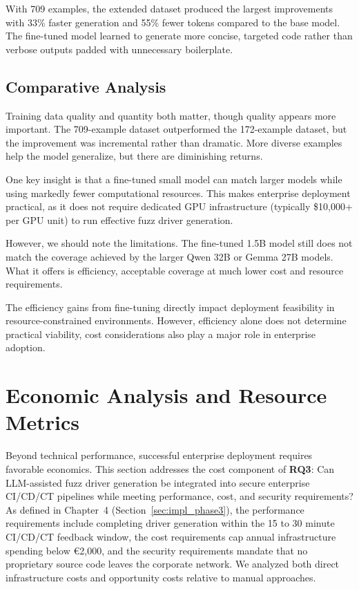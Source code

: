With 709 examples, the extended dataset produced the largest improvements with 33\% faster generation and 55\% fewer tokens compared to the base model. The fine-tuned model learned to generate more concise, targeted code rather than verbose outputs padded with unnecessary boilerplate.


\subsection{Comparative Analysis}
\label{sec:results_lora_analysis}

Training data quality and quantity both matter, though quality appears more important. The 709-example dataset outperformed the 172-example dataset, but the improvement was incremental rather than dramatic. More diverse examples help the model generalize, but there are diminishing returns.

One key insight is that a fine-tuned small model can match larger models while using markedly fewer computational resources. This makes enterprise deployment practical, as it does not require dedicated GPU infrastructure (typically \$10,000+ per GPU unit) to run effective fuzz driver generation.

However, we should note the limitations. The fine-tuned 1.5B model still does not match the coverage achieved by the larger Qwen 32B or Gemma 27B models. What it offers is efficiency, acceptable coverage at much lower cost and resource requirements.

The efficiency gains from fine-tuning directly impact deployment feasibility in resource-constrained environments. However, efficiency alone does not determine practical viability, cost considerations also play a major role in enterprise adoption.


\section{Economic Analysis and Resource Metrics}
\label{sec:results_economics}

Beyond technical performance, successful enterprise deployment requires favorable economics. This section addresses the cost component of \textbf{RQ3}: Can LLM-assisted fuzz driver generation be integrated into secure enterprise CI/CD/CT pipelines while meeting performance, cost, and security requirements? As defined in Chapter~4 (Section~\ref{sec:impl_phase3}), the performance requirements include completing driver generation within the 15 to 30 minute CI/CD/CT feedback window, the cost requirements cap annual infrastructure spending below \euro{}2,000, and the security requirements mandate that no proprietary source code leaves the corporate network. We analyzed both direct infrastructure costs and opportunity costs relative to manual approaches.

